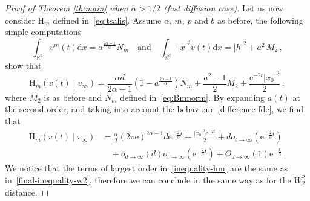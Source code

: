 \documentclass[10pt,reqno]{amsart}
\numberwithin{equation}{section}
\begin{document}
\begin{proof}[Proof of Theorem \ref{th:main} when $\alpha>1/2$ (fast diffusion case)]
Let us now consider $\mathrm{H}_m$ defined in~\eqref{eq:tsalis}. Assume $\alpha$, $m$, $p$ and $b$ as before, the following simple computations
\begin{equation}\label{needed.computations}
\int_{\mathbb{R}^d} v^m(t)\mathrm{d}x =  a^\frac{2\alpha-1}{\alpha} N_m \quad\mbox{and}\quad
\int_{\mathbb{R}^d} |x|^2v(t)\mathrm{d}x= |h|^2 + a^2\, M_2\,,
\end{equation}
show that
\begin{equation*}
 \mathrm{H}_m(v(t)\mid v_\infty) =\frac{\alpha d}{2\alpha-1}\left(1-a^\frac{2\alpha-1}{\alpha}\right) 
 N_m +\frac{a^2-1}{2}M_2 + \frac{\mathrm{e}^{-2t}|x_0|^2}{2}\,,
\end{equation*}
where $M_2$ is as before and $N_m$ defined in~\eqref{eq:Bmnorm}. By expanding $a(t)$ at the second order, and taking into account the behaviour~\eqref{difference-fde},  we find that
\begin{equation}\label{inequality-hm}
\begin{split}
     \mathrm{H}_m(v(t)\mid v_\infty)& =\frac{\alpha}{2} (2\pi\mathrm{e})^{2\alpha-1}d \mathrm{e}^{-\frac{2}{\alpha}t} + \frac{|x_0|^2 \mathrm{e}^{-2t}}{2}+  do_{t\rightarrow\infty}(\mathrm{e}^{-\frac{2}{\alpha}t}) \\ 
     & \quad + o_{d\rightarrow\infty}(d)o_{t\rightarrow\infty}(\mathrm{e}^{-\frac{2}{\alpha}t})  + O_{d\to\infty}(1) \mathrm{e}^{-\frac{t}{\alpha}}\,.
\end{split}
\end{equation}
We notice that the terms of largest order in~\eqref{inequality-hm} are the same as in~\eqref{final-inequality-w2}, therefore we can conclude in the same way as for the $W_2^2$ distance.


\end{proof}
\end{document}
